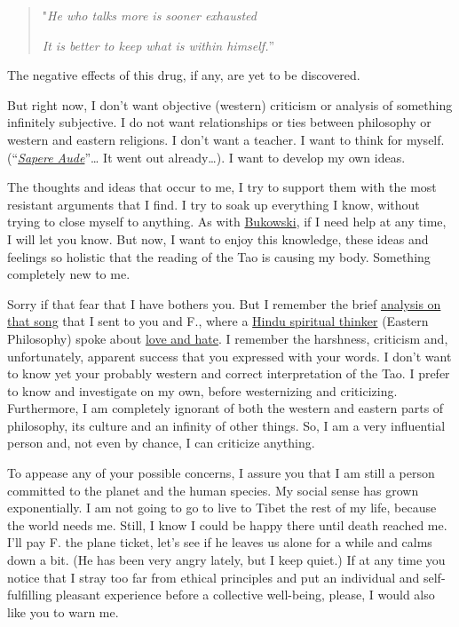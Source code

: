 \documentclass[]{book}
\begin{document}
\begin{quote}
"\emph{He who talks more is sooner exhausted}

\emph{It is better to keep what is within himself.}''

\citep{ta1984tao}
\end{quote}

The negative effects of this drug, if any, are yet to be discovered.

But right now, I don't want objective (western) criticism or analysis of something infinitely subjective. I do not want relationships or ties between philosophy or western and eastern religions. I don't want a teacher. I want to think for myself. (``\href{https://en.wikipedia.org/wiki/Sapere_aude}{\emph{Sapere Aude}}''\ldots{} It went out already\ldots). I want to develop my own ideas.

The thoughts and ideas that occur to me, I try to support them with the most resistant arguments that I find. I try to soak up everything I know, without trying to close myself to anything. As with \href{https://en.wikipedia.org/wiki/Charles_Bukowski}{Bukowski}, if I need help at any time, I will let you know. But now, I want to enjoy this knowledge, these ideas and feelings so holistic that the reading of the Tao is causing my body. Something completely new to me.

Sorry if that fear that I have bothers you. But I remember the brief \href{https://www.youtube.com/watch?v=M2A2Na2wIA8}{analysis on that song} that I sent to you and F., where a \href{https://en.wikipedia.org/wiki/Rajneesh}{Hindu spiritual thinker} (Eastern Philosophy) spoke about \href{http://yaqui.co/music/2013/2/8/klangkarussell-netzwerk}{love and hate}. I remember the harshness, criticism and, unfortunately, apparent success that you expressed with your words. I don't want to know yet your probably western and correct interpretation of the Tao. I prefer to know and investigate on my own, before westernizing and criticizing. Furthermore, I am completely ignorant of both the western and eastern parts of philosophy, its culture and an infinity of other things. So, I am a very influential person and, not even by chance, I can criticize anything.

To appease any of your possible concerns, I assure you that I am still a person committed to the planet and the human species. My social sense has grown exponentially. I am not going to go to live to Tibet the rest of my life, because the world needs me. Still, I know I could be happy there until death reached me. I'll pay F. the plane ticket, let's see if he leaves us alone for a while and calms down a bit. (He has been very angry lately, but I keep quiet.) If at any time you notice that I stray too far from ethical principles and put an individual and self-fulfilling pleasant experience before a collective well-being, please, I would also like you to warn me.
\end{document}
